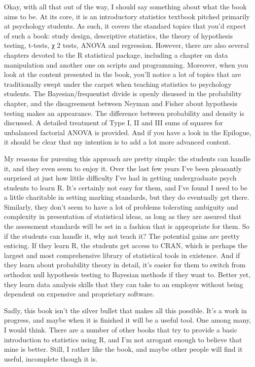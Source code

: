 \documentclass[
  letterpaper,
]{book}
\begin{document}
Okay, with all that out of the way, I should say something about what
the book aims to be. At its core, it is an introductory statistics
textbook pitched primarily at psychology students. As such, it covers
the standard topics that you'd expect of such a book: study design,
descriptive statistics, the theory of hypothesis testing, t-tests, χ 2
tests, ANOVA and regression. However, there are also several chapters
devoted to the R statistical package, including a chapter on data
manipulation and another one on scripts and programming. Moreover, when
you look at the content presented in the book, you'll notice a lot of
topics that are traditionally swept under the carpet when teaching
statistics to psychology students. The Bayesian/frequentist divide is
openly disussed in the probability chapter, and the disagreement between
Neyman and Fisher about hypothesis testing makes an appearance. The
difference between probability and density is discussed. A detailed
treatment of Type I, II and III sums of squares for unbalanced factorial
ANOVA is provided. And if you have a look in the Epilogue, it should be
clear that my intention is to add a lot more advanced content.

My reasons for pursuing this approach are pretty simple: the students
can handle it, and they even seem to enjoy it. Over the last few years
I've been pleasantly surprised at just how little difficulty I've had in
getting undergraduate psych students to learn R. It's certainly not easy
for them, and I've found I need to be a little charitable in setting
marking standards, but they do eventually get there. Similarly, they
don't seem to have a lot of problems tolerating ambiguity and complexity
in presentation of statistical ideas, as long as they are assured that
the assessment standards will be set in a fashion that is appropriate
for them. So if the students can handle it, why not teach it? The
potential gains are pretty enticing. If they learn R, the students get
access to CRAN, which is perhaps the largest and most comprehensive
library of statistical tools in existence. And if they learn about
probability theory in detail, it's easier for them to switch from
orthodox null hypothesis testing to Bayesian methods if they want to.
Better yet, they learn data analysis skills that they can take to an
employer without being dependent on expensive and proprietary software.

Sadly, this book isn't the silver bullet that makes all this possible.
It's a work in progress, and maybe when it is finished it will be a
useful tool. One among many, I would think. There are a number of other
books that try to provide a basic introduction to statistics using R,
and I'm not arrogant enough to believe that mine is better. Still, I
rather like the book, and maybe other people will find it useful,
incomplete though it is.
\end{document}
